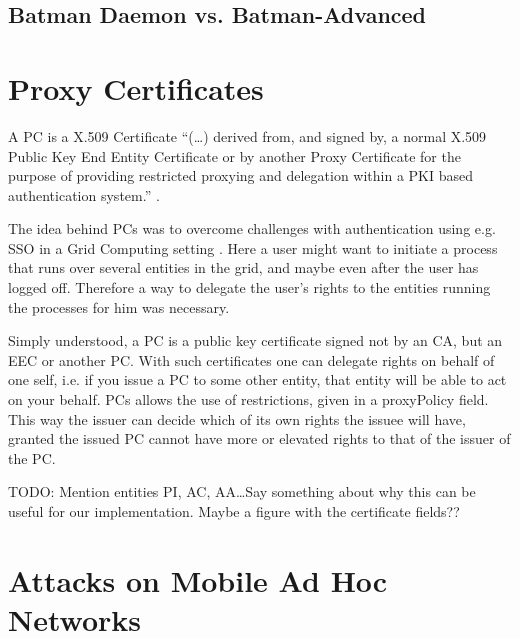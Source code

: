 \subsection{Batman Daemon vs. Batman-Advanced}

\section{Proxy Certificates}
A \acf{PC} is a X.509 Certificate ``(\ldots) derived from, and signed by, a
normal X.509 Public Key End Entity Certificate or by another Proxy Certificate
for the purpose of providing restricted proxying and delegation within a PKI
based authentication system.'' \cite{rfc3820}.

The idea behind \acp{PC} was to overcome challenges with authentication
using e.g. \ac{SSO} in a Grid Computing setting \cite{foster1998security}. Here
a user might want to initiate a process that runs over several entities in the
grid, and maybe even after the user has logged off. Therefore a way to delegate
the user's rights to the entities running the processes for him was necessary.

Simply understood, a \ac{PC} is a public key certificate signed not
by an \ac{CA}, but an \ac{EEC} or another \ac{PC}. With such certificates one
can delegate rights on behalf of one self, i.e. if you issue a \ac{PC} to some
other entity, that entity will be able to act on your behalf. \acp{PC} allows
the use of restrictions, given in a proxyPolicy field. This way the issuer can
decide which of its own rights the issuee will have, granted the issued \ac{PC}
cannot have more or elevated rights to that of the issuer of the \ac{PC}.

TODO: Mention entities PI, AC, AA\ldots Say something about why this can be
useful for our implementation. Maybe a figure with the certificate fields??




\section{Attacks on Mobile Ad Hoc Networks}
